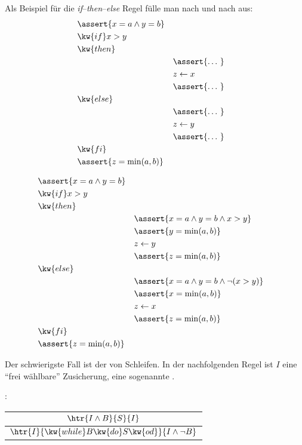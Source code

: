 \begin{tutorium}
  Als Beispiel für die \emph{if}--\emph{then}--\emph{else} Regel fülle man
  nach und nach aus:
  \begin{alignat*}{2}
    &\assert{x=a \land y=b}  \\
    &\kw{if } x>y  \\
    &\kw{then } \\
    &&&\assert{ \dots\ } \\
    &&& z \gets x  \\
    &&&\assert{ \dots\ } \\
    &\kw{else } \\
    &&&\assert{ \dots\ } \\
    &&& z \gets y  \\
    &&&\assert{ \dots\ } \\
    &\kw{fi } \\
    &\assert{z=\min(a,b)}
  \end{alignat*}

  \begin{alignat*}{2}
    &\assert{x=a \land y=b}  \\
    &\kw{if } x>y  \\
    &\kw{then } \\
    &&&\assert{x=a \land y=b \land x>y} \\
    &&&\assert{y=\min(a,b)} \\
    &&& z \gets y  \\
    &&&\assert{z=\min(a,b)} \\
    &\kw{else } \\
    &&&\assert{x=a \land y=b \land  \lnot (x>y)} \\
    &&&\assert{x=\min(a,b)} \\
    &&& z \gets x  \\
    &&&\assert{z=\min(a,b)} \\
    &\kw{fi } \\
    &\assert{z=\min(a,b)}
  \end{alignat*}
\end{tutorium}

Der schwierigste Fall ist der von Schleifen.
%
In der nachfolgenden Regel ist $I$ eine "`frei wählbare"' Zusicherung,
eine sogenannte %
.

: \quad \begin{tabular}{c}
                $\htr{I \land B}{S}{I}$ \\
                \midrule
                $\htr{I}{\kw{while } B \kw{ do } S \kw{ od}}{I\land \lnot B}$
              \end{tabular}
              
